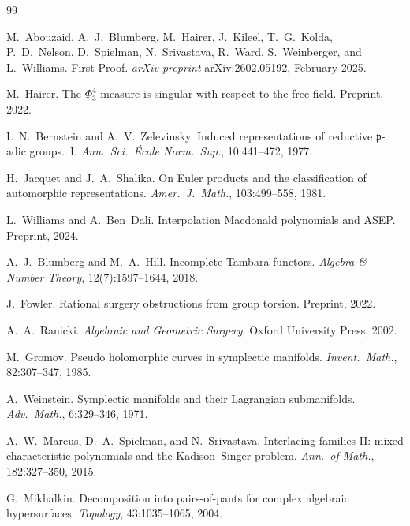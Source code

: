\documentclass[11pt]{article}
\theoremstyle{definition}
\theoremstyle{remark}
\begin{document}
\begin{thebibliography}{99}

M.~Abouzaid, A.~J.~Blumberg, M.~Hairer, J.~Kileel, T.~G.~Kolda,
P.~D.~Nelson, D.~Spielman, N.~Srivastava, R.~Ward, S.~Weinberger,
and L.~Williams.
\newblock First Proof.
\newblock \emph{arXiv preprint} arXiv:2602.05192, February 2025.

M.~Hairer.
\newblock The $\Phi^4_3$ measure is singular with respect to the free field.
\newblock Preprint, 2022.

I.~N.~Bernstein and A.~V.~Zelevinsky.
\newblock Induced representations of reductive $\mathfrak p$-adic groups.~I.
\newblock \emph{Ann.\ Sci.\ \'{E}cole Norm.\ Sup.}, 10:441--472, 1977.

H.~Jacquet and J.~A.~Shalika.
\newblock On Euler products and the classification of automorphic representations.
\newblock \emph{Amer.\ J.\ Math.}, 103:499--558, 1981.

L.~Williams and A.~Ben~Dali.
\newblock Interpolation Macdonald polynomials and ASEP.
\newblock Preprint, 2024.

A.~J.~Blumberg and M.~A.~Hill.
\newblock Incomplete Tambara functors.
\newblock \emph{Algebra \& Number Theory}, 12(7):1597--1644, 2018.

J.~Fowler.
\newblock Rational surgery obstructions from group torsion.
\newblock Preprint, 2022.

A.~A.~Ranicki.
\newblock \emph{Algebraic and Geometric Surgery}.
\newblock Oxford University Press, 2002.

M.~Gromov.
\newblock Pseudo holomorphic curves in symplectic manifolds.
\newblock \emph{Invent.\ Math.}, 82:307--347, 1985.

A.~Weinstein.
\newblock Symplectic manifolds and their Lagrangian submanifolds.
\newblock \emph{Adv.\ Math.}, 6:329--346, 1971.

A.~W.~Marcus, D.~A.~Spielman, and N.~Srivastava.
\newblock Interlacing families II: mixed characteristic polynomials
  and the Kadison--Singer problem.
\newblock \emph{Ann.\ of Math.}, 182:327--350, 2015.

G.~Mikhalkin.
\newblock Decomposition into pairs-of-pants for complex algebraic hypersurfaces.
\newblock \emph{Topology}, 43:1035--1065, 2004.


\end{thebibliography}
\end{document}
